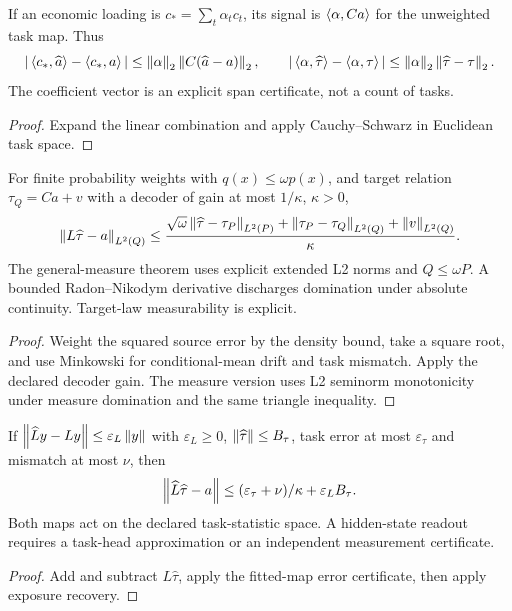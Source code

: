 \begin{theorem}\label{thm:task-span-coverage}
  \leanok
  If an economic loading is $c_* =\sum_t\alpha_tc_t$, its signal is
  $\left\langle\alpha,Ca\right\rangle$ for the unweighted task map. Thus
  \[
    |\left\langle c_*,\widehat a\right\rangle-\left\langle c_*,a\right\rangle|
    \le\left\lVert\alpha\right\rVert_2\left\lVert C(\widehat a-a)\right\rVert_2,
    \qquad
    |\left\langle\alpha,\widehat\tau\right\rangle-\left\langle\alpha,\tau\right\rangle|
    \le\left\lVert\alpha\right\rVert_2\left\lVert\widehat\tau-\tau\right\rVert_2.
  \]
  The coefficient vector is an explicit span certificate, not a count of tasks.
\end{theorem}
\begin{proof}\leanok
  Expand the linear combination and apply Cauchy--Schwarz in
  Euclidean task space.
\end{proof}

\begin{theorem}\label{thm:transfer-recovery}
  \leanok
  For finite probability weights with $q(x)\le\omega p(x)$, and target relation
  $\tau_Q=Ca+v$ with a decoder of gain at most $1/\kappa$, $\kappa>0$,
  \[
    \left\lVert L\widehat\tau-a\right\rVert_{L^2(Q)}
    \le\frac{\sqrt\omega\left\lVert\widehat\tau-\tau_P\right\rVert_{L^2(P)}
    +\left\lVert\tau_P-\tau_Q\right\rVert_{L^2(Q)}+\left\lVert v\right\rVert_{L^2(Q)}}\kappa.
  \]
  The general-measure theorem uses explicit extended L2 norms and
  $Q\le\omega P$. A bounded Radon--Nikodym derivative discharges domination
  under absolute continuity. Target-law measurability is explicit.
\end{theorem}
\begin{proof}\leanok
  Weight the squared source error by the density bound, take a square root,
  and use Minkowski for conditional-mean drift and task mismatch. Apply the
  declared decoder gain. The measure version uses L2 seminorm monotonicity
  under measure domination and the same triangle inequality.
\end{proof}

\begin{lemma}\label{thm:fitted-readout}
  \leanok
  If $\left\lVert\widehat L y-Ly\right\rVert\le\varepsilon_L\left\lVert y\right\rVert$ with
  $\varepsilon_L\ge0$, $\left\lVert\widehat\tau\right\rVert\le B_\tau$, task error at most
  $\varepsilon_\tau$ and mismatch at most $\nu$, then
  \[
    \left\lVert\widehat L\widehat\tau-a\right\rVert
    \le(\varepsilon_\tau+\nu)/\kappa+\varepsilon_LB_\tau.
  \]
  Both maps act on the declared task-statistic space. A hidden-state readout
  requires a task-head approximation or an independent measurement certificate.
\end{lemma}
\begin{proof}\leanok
  Add and subtract $L\widehat\tau$, apply the fitted-map error certificate,
  then apply exposure recovery.
\end{proof}

